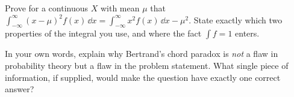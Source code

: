 \begin{exercise}
\label{ch10:exr-varproof}
Prove for a continuous $X$ with mean $\mu$ that
$\int_{-\infty}^{\infty}(x-\mu)^2 f(x)\,\dd x = \int_{-\infty}^{\infty} x^2 f(x)\,\dd x
- \mu^2$. State exactly which two properties of the integral you use, and where the
fact $\int f = 1$ enters.
\end{exercise}

\begin{exercise}
\label{ch10:exr-bertrand}
In your own words, explain why Bertrand's chord paradox is \emph{not} a flaw in
probability theory but a flaw in the problem statement. What single piece of
information, if supplied, would make the question have exactly one correct answer?
\end{exercise}
